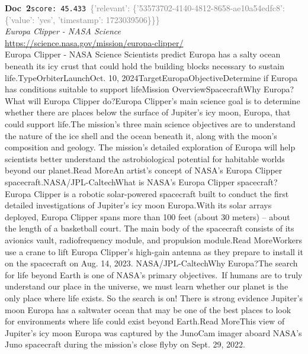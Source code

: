 \documentclass[a4paper,11pt]{article}
\begin{document}
\begin{docenv}
{\footnotesize\textcolor{doccolor}{\textbf{Doc~2}}}\hfill{\tiny\texttt{score:~45.433}}\ {\tiny\textcolor{gray}{\{'relevant': \{'53573702-4140-4812-8658-ae10a54edfc8': \{'value': 'yes', 'timestamp': 1723039506\}\}\}}}\\[3pt]
{\small\textit{Europa Clipper - NASA Science}}\\[2pt]
{\tiny\url{https://science.nasa.gov/mission/europa-clipper/}}\\[4pt]
{\footnotesize Europa Clipper - NASA Science
Scientists predict Europa has a salty ocean beneath its icy crust that could hold the building blocks necessary to sustain life.TypeOrbiterLaunchOct. 10, 2024TargetEuropaObjectiveDetermine if Europa has conditions suitable to support lifeMission OverviewSpacecraftWhy Europa?What will Europa Clipper do?Europa Clipper’s main science goal is to determine whether there are places below the surface of Jupiter’s icy moon, Europa, that could support life.The mission’s three main science objectives are to understand the nature of the ice shell and the ocean beneath it, along with the moon’s composition and geology. The mission’s detailed exploration of Europa will help scientists better understand the astrobiological potential for habitable worlds beyond our planet.Read MoreAn artist's concept of NASA’s Europa Clipper spacecraft.NASA/JPL-CaltechWhat is NASA’s Europa Clipper spacecraft?Europa Clipper is a robotic solar-powered spacecraft built to conduct the first detailed investigations of Jupiter's icy moon Europa.With its solar arrays deployed, Europa Clipper spans more than 100 feet (about 30 meters) – about the length of a basketball court. The main body of the spacecraft consists of its avionics vault, radiofrequency module, and propulsion module.Read MoreWorkers use a crane to lift Europa Clipper's high-gain antenna as they prepare to install it on the spacecraft on Aug. 14, 2023. NASA/JPL-CaltechWhy Europa?The search for life beyond Earth is one of NASA’s primary objectives. If humans are to truly understand our place in the universe, we must learn whether our planet is the only place where life exists. So the search is on! There is strong evidence Jupiter's moon Europa has a saltwater ocean that may be one of the best places to look for environments where life could exist beyond Earth.Read MoreThis view of Jupiter’s icy moon Europa was captured by the JunoCam imager aboard NASA’s Juno spacecraft during the mission’s close flyby on Sept. 29, 2022.}
\end{docenv}
\end{document}
